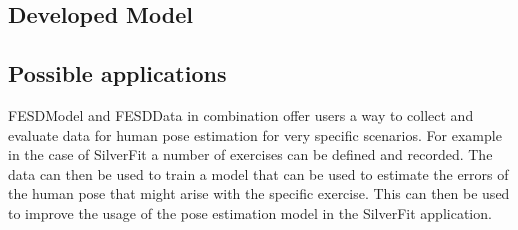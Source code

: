 \subsection{Developed Model}

\subsection{Possible applications}

FESDModel and FESDData in combination offer users a way to collect and evaluate data for human pose estimation for very specific scenarios. For example in the case of SilverFit a number of exercises can be defined and recorded. The data can then be used to train a model that can be used to estimate the errors of the human pose that might arise with the specific exercise. This can then be used to improve the usage of the pose estimation model in the SilverFit application.